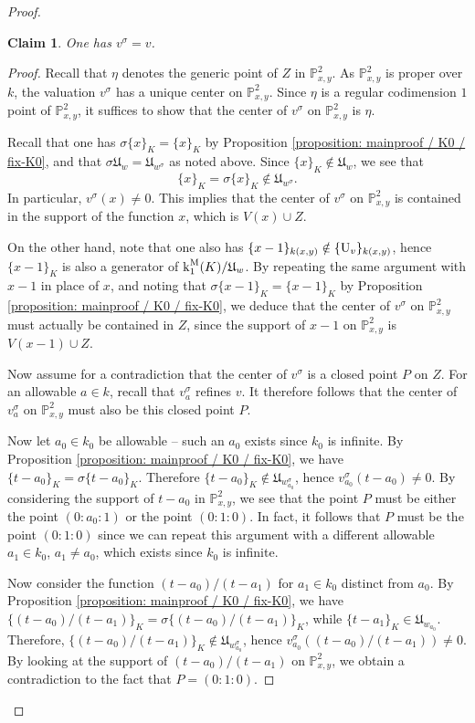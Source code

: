 \documentclass[11pt]{amsart}
\newtheorem*{claim*}{Claim}
\theoremstyle{definition}
\theoremstyle{remark}
\numberwithin{equation}{section}
\newcommand{\U}{{\rm U}}
\newcommand{\Pbb}{\mathbb{P}}
\newcommand{\Ufrak}{\mathfrak{U}}
\renewcommand{\k}{\operatorname{k}^{\rm M}}
\begin{document}
\begin{proof}
  \begin{claim*}
    One has $v^\sigma = v$.
  \end{claim*}
  \begin{proof}
    Recall that $\eta$ denotes the generic point of $Z$ in $\Pbb^2_{x,y}$.
    As $\Pbb^2_{x,y}$ is proper over $k$, the valuation $v^\sigma$ has a unique center on $\Pbb^2_{x,y}$.
    Since $\eta$ is a regular codimension $1$ point of $\Pbb^2_{x,y}$, it suffices to show that the center of $v^\sigma$ on $\Pbb^2_{x,y}$ is $\eta$.

    Recall that one has $\sigma\{x\}_K = \{x\}_K$ by Proposition \ref{proposition: mainproof / K0 / fix-K0}, and that $\sigma\Ufrak_w = \Ufrak_{w^\sigma}$ as noted above.
    Since $\{x\}_K \notin \Ufrak_w$, we see that
    \[ \{x\}_K = \sigma \{x\}_K \notin \Ufrak_{w^\sigma}. \]
    In particular, $v^\sigma(x) \neq 0$.
    This implies that the center of $v^\sigma$ on $\Pbb^2_{x,y}$ is contained in the support of the function $x$, which is $V(x) \cup Z$.

    On the other hand, note that one also has $\{x-1\}_{k(x,y)} \notin \{\U_v\}_{k(x,y)}$, hence $\{x-1\}_K$ is also a generator of $\k_1(K)/\Ufrak_w$.
    By repeating the same argument with $x-1$ in place of $x$, and noting that $\sigma\{x-1\}_K = \{x-1\}_K$ by Proposition \ref{proposition: mainproof / K0 / fix-K0}, we deduce that the center of $v^\sigma$ on $\Pbb^2_{x,y}$ must actually be contained in $Z$, since the support of $x-1$ on $\Pbb^2_{x,y}$ is $V(x-1) \cup Z$.

    Now assume for a contradiction that the center of $v^\sigma$ is a closed point $P$ on $Z$.
    For an allowable $a \in k$, recall that $v_a^\sigma$ refines $v$.
    It therefore follows that the center of $v_a^\sigma$ on $\Pbb^2_{x,y}$ must also be this closed point $P$.

    Now let $a_0 \in k_0$ be allowable -- such an $a_0$ exists since $k_0$ is infinite.
    By Proposition \ref{proposition: mainproof / K0 / fix-K0}, we have $\{t-a_0\}_K = \sigma\{t-a_0\}_K$.
    Therefore $\{t-a_0\}_K \notin \Ufrak_{w_{a_0}^\sigma}$, hence $v_{a_0}^\sigma(t-a_0) \neq 0$.
    By considering the support of $t-a_0$ in $\Pbb^2_{x,y}$, we see that the point $P$ must be either the point $(0:a_0:1)$ or the point $(0:1:0)$.
    In fact, it follows that $P$ must be the point $(0:1:0)$ since we can repeat this argument with a different allowable $a_1 \in k_0$, $a_1 \neq a_0$, which exists since $k_0$ is infinite.

    Now consider the function $(t-a_0)/(t-a_1)$ for $a_1 \in k_0$ distinct from $a_0$.
    By Proposition \ref{proposition: mainproof / K0 / fix-K0}, we have $\{(t-a_0)/(t-a_1)\}_K = \sigma\{(t-a_0)/(t-a_1)\}_K$, while $\{t-a_1\}_K \in \Ufrak_{w_{a_0}}$.
    Therefore, $\{(t-a_0)/(t-a_1)\}_K \notin \Ufrak_{w_{a_0}^\sigma}$, hence $v_{a_0}^\sigma((t-a_0)/(t-a_1)) \neq 0$.
    By looking at the support of $(t-a_0)/(t-a_1)$ on $\Pbb^2_{x,y}$, we obtain a contradiction to the fact that $P = (0:1:0)$.


\end{proof}
\end{proof}
\end{document}
